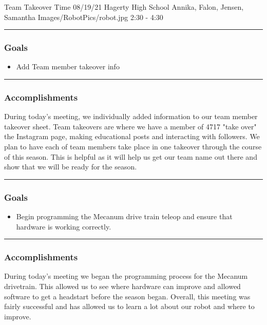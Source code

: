 \insertmeeting 
	{Team Takeover Time} 
	{08/19/21}
	{Hagerty High School}
	{Annika, Falon, Jensen, Samantha}
	{Images/RobotPics/robot.jpg}
	{2:30 - 4:30}
	
\noindent\hfil\rule{\textwidth}{.4pt}\hfil
\subsubsection*{Goals}
\begin{itemize}
    \item Add Team member takeover info  

\end{itemize} 

\noindent\hfil\rule{\textwidth}{.4pt}\hfil

\subsubsection*{Accomplishments}
During today's meeting, we individually added information to our team member takeover sheet. Team takeovers are where we have a member of 4717 "take over" the Instagram page, making educational posts and interacting with followers. We plan to have each of team members take place in one takeover through the course of this season. This is helpful as it will help us get our team name out there and show that we will be ready for the season.

\noindent\hfil\rule{\textwidth}{.4pt}\hfil
\subsubsection*{Goals}
\begin{itemize}
    \item Begin programming the Mecanum drive train teleop and ensure that hardware is working correctly.

\end{itemize} 

\noindent\hfil\rule{\textwidth}{.4pt}\hfil

\subsubsection*{Accomplishments}
During today's meeting we began the programming process for the Mecanum drivetrain. This allowed us to see where hardware can improve and allowed software to get a headstart before the season began. Overall, this meeting was fairly successful and has allowed us to learn a lot about our robot and where to improve.